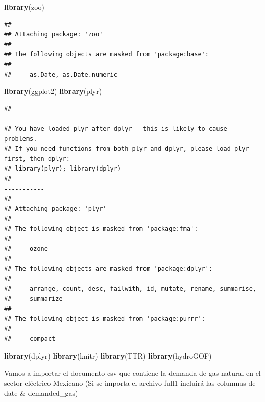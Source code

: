 \documentclass[
]{article}
\newenvironment{Shaded}{\begin{snugshade}}{\end{snugshade}}
\newcommand{\FunctionTok}[1]{\textcolor[rgb]{0.13,0.29,0.53}{\textbf{#1}}}
\newcommand{\NormalTok}[1]{#1}
\begin{document}
\begin{Shaded}
\begin{Highlighting}[]
\FunctionTok{library}\NormalTok{(zoo)}
\end{Highlighting}
\end{Shaded}

\begin{verbatim}
## 
## Attaching package: 'zoo'
## 
## The following objects are masked from 'package:base':
## 
##     as.Date, as.Date.numeric
\end{verbatim}

\begin{Shaded}
\begin{Highlighting}[]
\FunctionTok{library}\NormalTok{(ggplot2)}
\FunctionTok{library}\NormalTok{(plyr)}
\end{Highlighting}
\end{Shaded}

\begin{verbatim}
## ------------------------------------------------------------------------------
## You have loaded plyr after dplyr - this is likely to cause problems.
## If you need functions from both plyr and dplyr, please load plyr first, then dplyr:
## library(plyr); library(dplyr)
## ------------------------------------------------------------------------------
## 
## Attaching package: 'plyr'
## 
## The following object is masked from 'package:fma':
## 
##     ozone
## 
## The following objects are masked from 'package:dplyr':
## 
##     arrange, count, desc, failwith, id, mutate, rename, summarise,
##     summarize
## 
## The following object is masked from 'package:purrr':
## 
##     compact
\end{verbatim}

\begin{Shaded}
\begin{Highlighting}[]
\FunctionTok{library}\NormalTok{(dplyr)}
\FunctionTok{library}\NormalTok{(knitr)}
\FunctionTok{library}\NormalTok{(TTR)}
\FunctionTok{library}\NormalTok{(hydroGOF)}
\end{Highlighting}
\end{Shaded}

Vamos a importar el documento csv que contiene la demanda de gas natural
en el sector eléctrico Mexicano (Si se importa el archivo full1 incluirá
las columnas de date \& demanded\_gas)
\end{document}
